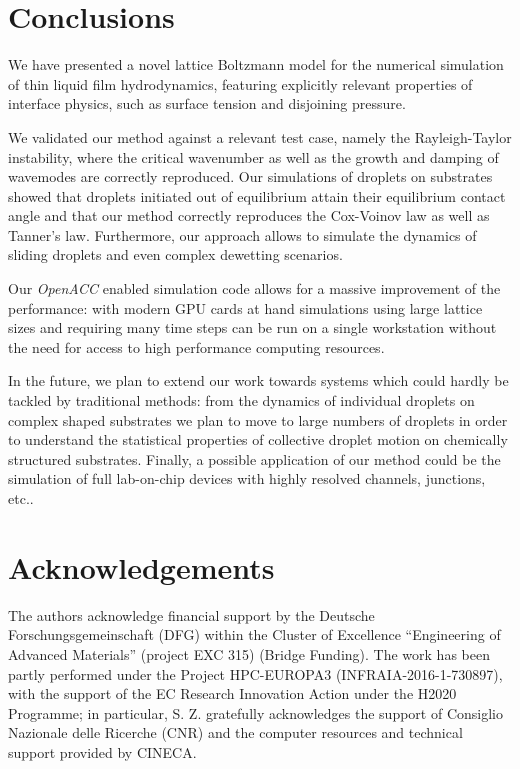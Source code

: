 \section{Conclusions}\label{sec:conclusions}
We have presented a novel lattice Boltzmann model for the numerical simulation of thin liquid film hydrodynamics, featuring explicitly relevant properties of interface physics, such as surface tension and disjoining pressure.

We validated our method against a relevant test case, namely the Rayleigh-Taylor instability, where the critical wavenumber as well as the growth and damping of wavemodes are correctly reproduced. 
Our simulations of droplets on substrates showed that droplets initiated out of equilibrium attain their equilibrium contact angle and that our method correctly reproduces the Cox-Voinov law as well as Tanner's law. 
Furthermore, our approach allows to simulate the dynamics of sliding droplets and even complex dewetting scenarios.

Our \textit{OpenACC} enabled simulation code allows for a massive improvement of the performance: with modern GPU cards at hand simulations using large lattice sizes and requiring many time steps can be run on a single workstation without the need for access to high performance computing resources.

In the future, we plan to extend our work towards systems which could hardly be tackled by traditional methods: from the dynamics of individual droplets on complex shaped substrates we plan to move to large numbers of droplets in order to understand the statistical properties of collective droplet motion on chemically structured substrates. 
Finally, a possible application of our method could be the simulation of full lab-on-chip devices with highly resolved channels, junctions, etc..
%

\section{Acknowledgements}\label{sec:ack}
The authors acknowledge financial support by the Deutsche Forschungsgemeinschaft (DFG) within the Cluster of Excellence ``Engineering of Advanced Materials'' (project EXC 315) (Bridge Funding). 
The work has been partly performed under the Project HPC-EUROPA3 (INFRAIA-2016-1-730897), with the support of the EC Research Innovation Action under the H2020 Programme; in particular, S. Z. gratefully acknowledges the support of Consiglio Nazionale delle Ricerche (CNR) and the computer resources and technical support provided by CINECA.

